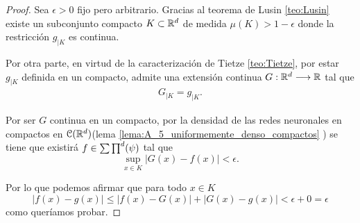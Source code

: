     \reversemarginpar

    
\begin{proof}
    Sea $\epsilon > 0$ fijo pero arbitrario.  Gracias al teorema de Lusin \ref{teo:Lusin}
    existe un subconjunto compacto $K \subset \mathbb{R}^d$ de medida
    $\mu(K) > 1 - \epsilon$ donde la restricción  $g_{|K}$ es continua. 

    Por otra parte, en virtud de la caracterización de Tietze 
    \ref{teo:Tietze}, 
    por estar $g_{|K}$ definida en un compacto, admite una 
    extensión continua $G:\mathbb{R}^d \longrightarrow \mathbb{R}$ tal que 
    \begin{equation}
        \begin{split}
            G_{|K} = g_{|K} .
        \end{split}
    \end{equation}

    Por ser $G$ continua en un compacto, por la densidad de las redes neuronales en compactos en $\mathcal{C}(\mathbb{R}^d)$(lema \ref{lema:A_5_uniformemente_denso_compactos} ) se tiene que existirá 
     $f \in \sum \prod^d (\psi)$ tal que 
    \begin{equation}
        \sup_{x \in K} |G(x) - f(x)| < \epsilon.
    \end{equation}

    Por lo que podemos afirmar que para todo $x \in K$
    \begin{equation}
        |f(x) -g(x)| 
        \leq 
        | f(x) -G(x)| + |G(x) -g(x)|
        < \epsilon + 0 = \epsilon
    \end{equation}
    como queríamos probar.
\end{proof}


